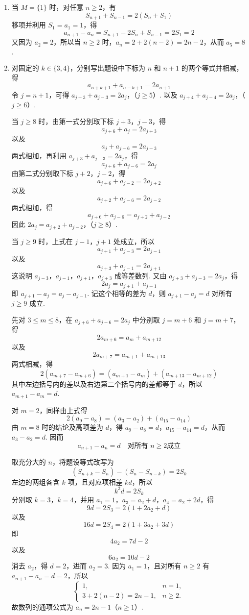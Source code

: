 \begin{solution}
\begin{enumerate}
\item 当 \(M=\{1\}\) 时，对任意 \(n\geqslant2\)，有
\[
S_{n+1}+S_{n-1}=2(S_n+S_1)
\]
移项并利用 \(S_1=a_1=1\)，得
\[
a_{n+1}-a_n=S_{n+1}-2S_n+S_{n-1}=2S_1=2
\]
又因为 \(a_2=2\)，所以当 \(n\geqslant2\) 时，\(a_n=2+2(n-2)=2n-2\)，从而 \(a_5=8\).

\item 对固定的 \(k\in\{3,4\}\)，分别写出题设中下标为 \(n\) 和 \(n+1\) 的两个等式并相减，得
\[
a_{n+k+1}+a_{n-k+1}=2a_{n+1}
\]
令 \(j=n+1\)，可得
\(a_{j+3}+a_{j-3}=2a_j\)，（\(j\geqslant5\)）.
以及
\(a_{j+4}+a_{j-4}=2a_j\)，（\(j\geqslant6\)）.

当 \(j\geqslant8\) 时，由第一式分别取下标 \(j+3\)，\(j-3\)，得
\[
a_{j+6}+a_j=2a_{j+3}
\]
以及
\[
a_j+a_{j-6}=2a_{j-3}
\]
两式相加，再利用 \(a_{j+3}+a_{j-3}=2a_j\)，得
\[
a_{j+6}+a_{j-6}=2a_j
\]
由第二式分别取下标 \(j+2\)，\(j-2\)，得
\[
a_{j+6}+a_{j-2}=2a_{j+2}
\]
以及
\[
a_{j+2}+a_{j-6}=2a_{j-2}
\]
两式相加，得
\[
a_{j+6}+a_{j-6}=a_{j+2}+a_{j-2}
\]
因此
\(2a_j=a_{j+2}+a_{j-2}\)，（\(j\geqslant8\)）.

当 \(j\geqslant9\) 时，上式在 \(j-1\)，\(j+1\) 处成立，所以
\[
a_{j+1}+a_{j-3}=2a_{j-1}
\]
以及
\[
a_{j+3}+a_{j-1}=2a_{j+1}
\]
这说明 \(a_{j-3}\)，\(a_{j-1}\)，\(a_{j+1}\)，\(a_{j+3}\) 成等差数列. 又由 \(a_{j+3}+a_{j-3}=2a_j\)，得
\[
2a_j=a_{j+1}+a_{j-1}
\]
即 \(a_{j+1}-a_j=a_j-a_{j-1}\). 记这个相等的差为 \(d\)，则 \(a_{j+1}-a_j=d\) 对所有 \(j\geqslant9\) 成立.

先对 \(3\leqslant m\leqslant8\)，在 \(a_{j+6}+a_{j-6}=2a_j\) 中分别取 \(j=m+6\) 和 \(j=m+7\)，得
\[
2a_{m+6}=a_m+a_{m+12}
\]
以及
\[
2a_{m+7}=a_{m+1}+a_{m+13}
\]
两式相减，得
\[
2(a_{m+7}-a_{m+6})=(a_{m+1}-a_m)+(a_{m+13}-a_{m+12})
\]
其中左边括号内的差以及右边第二个括号内的差都等于 \(d\)，所以 \(a_{m+1}-a_m=d\).

对 \(m=2\)，同样由上式得
\[
2(a_9-a_8)=(a_3-a_2)+(a_{15}-a_{14})
\]
由 \(m=8\) 时的结论及高项差为 \(d\)，得 \(a_9-a_8=d\)，\(a_{15}-a_{14}=d\)，从而 \(a_3-a_2=d\). 因而
\[
a_{n+1}-a_n=d\quad\text{对所有 }n\geqslant2\text{成立}
\]

取充分大的 \(n\)，将题设等式改写为
\[
(S_{n+k}-S_n)-(S_n-S_{n-k})=2S_k
\]
左边的两组各含 \(k\) 项，且对应项相差 \(kd\)，所以
\[
k^2d=2S_k
\]
分别取 \(k=3\)，\(k=4\)，并用 \(a_1=1\)，\(a_3=a_2+d\)，\(a_4=a_2+2d\)，得
\[
9d=2S_3=2(1+2a_2+d)
\]
以及
\[
16d=2S_4=2(1+3a_2+3d)
\]
即
\[
4a_2=7d-2
\]
以及
\[
6a_2=10d-2
\]
消去 \(a_2\)，得 \(d=2\)，进而 \(a_2=3\). 因为 \(a_1=1\)，且对所有 \(n\geqslant2\) 有 \(a_{n+1}-a_n=d=2\)，所以
\[
\begin{cases}
1,&n=1,\\
3+2(n-2)=2n-1,&n\geqslant2.
\end{cases}
\]
故数列的通项公式为 \(a_n=2n-1\)（\(n\geqslant1\)）.
\end{enumerate}
\end{solution}

